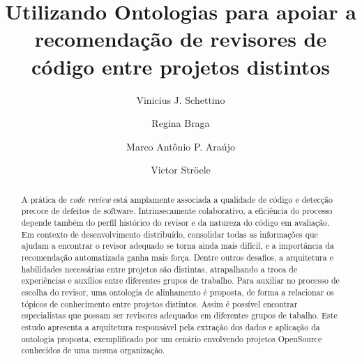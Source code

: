 \documentclass[sigconf]{acmart}
\begin{document}
\title{Utilizando Ontologias para apoiar a recomendação de revisores de código entre projetos distintos}

\author{Vinicius J. Schettino}

\author{Regina Braga}

\author{Marco Antônio P. Araújo}

\author{Victor Ströele}

\renewcommand{\shortauthors}{Schettino et al.}


\begin{abstract}
A prática de \textit{code review} está amplamente associada a qualidade de código e detecção precoce de defeitos de software. Intrinsecamente colaborativo, a eficiência do processo depende também do perfil histórico do revisor e da natureza do código em avaliação. Em contexto de desenvolvimento distribuído, consolidar todas as informações que ajudam a encontrar o revisor adequado se torna ainda mais difícil, e a importância da recomendação automatizada ganha mais força. Dentre outros desafios, a arquitetura e habilidades necessárias entre projetos são distintas, atrapalhando a troca de experiências e auxílios entre diferentes grupos de trabalho. Para auxiliar no processo de escolha do revisor, uma ontologia de alinhamento é proposta, de forma a relacionar os tópicos de conhecimento entre projetos distintos. Assim é possível encontrar especialistas que possam ser revisores adequados em diferentes grupos de tabalho. Este estudo apresenta a  arquitetura responsável pela extração dos dados e aplicação da ontologia proposta, exemplificado por um cenário envolvendo projetos OpenSource conhecidos de uma mesma organização.
\end{abstract}
\end{document}
